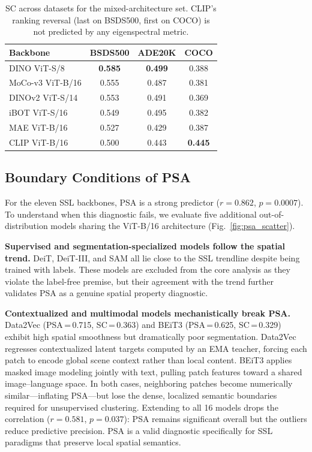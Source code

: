 \documentclass[runningheads]{llncs}
\begin{document}
\begin{table}[H]
\centering
\caption{SC across datasets for the mixed-architecture set. CLIP's ranking reversal (last on BSDS500, first on COCO) is not predicted by any eigenspectral metric.}
\label{tab:cross_dataset}
\small
\begin{tabular}{lccc}
\toprule
Backbone & BSDS500 & ADE20K & COCO \\
\midrule
DINO ViT-S/8     & \textbf{0.585} & \textbf{0.499} & 0.388 \\
MoCo-v3 ViT-B/16 & 0.555 & 0.487 & 0.381 \\
DINOv2 ViT-S/14  & 0.553 & 0.491 & 0.369 \\
iBOT ViT-S/16    & 0.549 & 0.495 & 0.382 \\
MAE ViT-B/16     & 0.527 & 0.429 & 0.387 \\
CLIP ViT-B/16    & 0.500 & 0.443 & \textbf{0.445} \\
\bottomrule
\end{tabular}
\vspace{-15pt}
\end{table}

\subsection{Boundary Conditions of PSA}
\label{sec:boundary_conditions}

For the eleven SSL backbones, PSA is a strong predictor ($r=0.862$, $p=0.0007$). To understand when this diagnostic fails, we evaluate five additional out-of-distribution models sharing the ViT-B/16 architecture (Fig.~\ref{fig:psa_scatter}).

\textbf{Supervised and segmentation-specialized models follow the spatial trend.} DeiT, DeiT-III, and SAM all lie close to the SSL trendline despite being trained with labels. These models are excluded from the core analysis as they violate the label-free premise, but their agreement with the trend further validates PSA as a genuine spatial property diagnostic.

\textbf{Contextualized and multimodal models mechanistically break PSA.} Data2Vec \cite{baevski2022data2vec} (PSA\,=\,0.715, SC\,=\,0.363) and BEiT3 \cite{wang2023beit3} (PSA\,=\,0.625, SC\,=\,0.329) exhibit high spatial smoothness but dramatically poor segmentation. Data2Vec regresses contextualized latent targets computed by an EMA teacher, forcing each patch to encode global scene context rather than local content. BEiT3 applies masked image modeling jointly with text, pulling patch features toward a shared image--language space. In both cases, neighboring patches become numerically similar---inflating PSA---but lose the dense, localized semantic boundaries required for unsupervised clustering. Extending to all 16 models drops the correlation ($r=0.581$, $p=0.037$): PSA remains significant overall but the outliers reduce predictive precision. PSA is a valid diagnostic specifically for SSL paradigms that preserve local spatial semantics.
\end{document}
